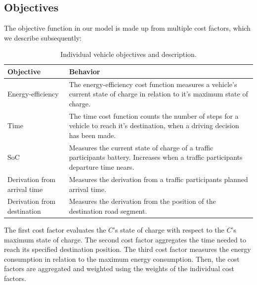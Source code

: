 \subsection{Objectives}
\label{objectives}

The objective function in our model is made up from multiple cost factors, which we describe subsequently:

\begin{table}[h!]
	\centering
	\renewcommand{\arraystretch}{1.3}
	\begin{tabularx}{\columnwidth}{|Y|Y|}
		\hline
		
		\textbf{Objective} & \textbf{Behavior} \\
		
		\hline
		
		Energy-efficiency &
		The energy-efficiency cost function measures a vehicle's current state of charge in relation to it's maximum state of charge. \\
		
		\hline
		
		Time &
		The time cost function counts the number of steps for a vehicle to reach it's destination, when a driving decision has been made. \\
		
		\hline
		
		SoC &
		Measures the current state of charge of a traffic participants battery. Increases when a traffic participants departure time nears. \\
		
		\hline
		
		Derivation from arrival time &
		Measures the derivation from a traffic participants planned arrival time. \\
		
		\hline
		
		Derivation from destination &
		Measures the derivation from the position of the destination road segment. \\
		
		\hline			
	\end{tabularx}
	\caption{Individual vehicle objectives and description.}
	\label{figure:objectives}
\end{table}

The first cost factor evaluates the $C$'s state of charge with respect to the $C$'s maximum state of charge. The second cost factor aggregates the time needed to reach its specified destination position. The third cost factor measures the energy consumption in relation to the maximum energy consumption. Then, the cost factors are aggregated and weighted using the weights of the individual cost factors.

